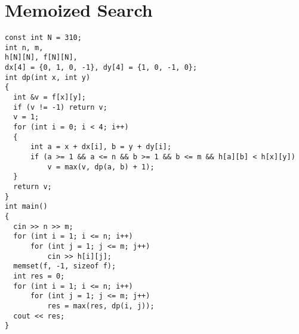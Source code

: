 \section{Memoized Search}
\begin{lstlisting}
const int N = 310;
int n, m, 
h[N][N], f[N][N], 
dx[4] = {0, 1, 0, -1}, dy[4] = {1, 0, -1, 0};
int dp(int x, int y)
{
  int &v = f[x][y];
  if (v != -1) return v;
  v = 1;
  for (int i = 0; i < 4; i++)
  {
      int a = x + dx[i], b = y + dy[i];
      if (a >= 1 && a <= n && b >= 1 && b <= m && h[a][b] < h[x][y])
          v = max(v, dp(a, b) + 1);
  }
  return v;
}
int main()
{
  cin >> n >> m;
  for (int i = 1; i <= n; i++)
      for (int j = 1; j <= m; j++)
          cin >> h[i][j];
  memset(f, -1, sizeof f);
  int res = 0;
  for (int i = 1; i <= n; i++)
      for (int j = 1; j <= m; j++)
          res = max(res, dp(i, j));
  cout << res;
}
\end{lstlisting}
